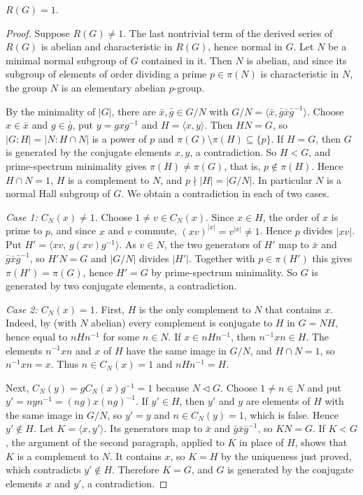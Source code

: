 \documentclass[11pt,colorlinks]{charlie}
\newcommand{\gen}[1]{\langle #1\rangle}
\begin{document}
\begin{proposition}\label{prop:radical}
$R(G)=1$.
\end{proposition}

\begin{proof}
Suppose $R(G)\ne1$. The last nontrivial term of the derived series of $R(G)$ is abelian and characteristic in $R(G)$, hence normal in $G$. Let $N$ be a minimal normal subgroup of $G$ contained in it. Then $N$ is abelian, and since its subgroup of elements of order dividing a prime $p\in\pi(N)$ is characteristic in $N$, the group $N$ is an elementary abelian $p$-group.

By the minimality of $|G|$, there are $\bar x,\bar g\in G/N$ with $G/N=\gen{\bar x,\bar g\bar x\bar g^{-1}}$. Choose $x\in\bar x$ and $g\in\bar g$, put $y=gxg^{-1}$ and $H=\gen{x,y}$. Then $HN=G$, so $|G:H|=|N:H\cap N|$ is a power of $p$ and $\pi(G)\setminus\pi(H)\subseteq\{p\}$. If $H=G$, then $G$ is generated by the conjugate elements $x,y$, a contradiction. So $H<G$, and prime-spectrum minimality gives $\pi(H)\ne\pi(G)$, that is, $p\notin\pi(H)$. Hence $H\cap N=1$, $H$ is a complement to $N$, and $p\nmid|H|=|G/N|$. In particular $N$ is a normal Hall subgroup of $G$. We obtain a contradiction in each of two cases.

\emph{Case 1: $C_N(x)\ne1$.} Choose $1\ne v\in C_N(x)$. Since $x\in H$, the order of $x$ is prime to $p$, and since $x$ and $v$ commute, $(xv)^{|x|}=v^{|x|}\ne1$. Hence $p$ divides $|xv|$. Put $H'=\gen{xv,\,g(xv)g^{-1}}$. As $v\in N$, the two generators of $H'$ map to $\bar x$ and $\bar g\bar x\bar g^{-1}$, so $H'N=G$ and $|G/N|$ divides $|H'|$. Together with $p\in\pi(H')$ this gives $\pi(H')=\pi(G)$, hence $H'=G$ by prime-spectrum minimality. So $G$ is generated by two conjugate elements, a contradiction.

\emph{Case 2: $C_N(x)=1$.} First, $H$ is the only complement to $N$ that contains $x$. Indeed, by  (with $N$ abelian) every complement is conjugate to $H$ in $G=NH$, hence equal to $nHn^{-1}$ for some $n\in N$. If $x\in nHn^{-1}$, then $n^{-1}xn\in H$. The elements $n^{-1}xn$ and $x$ of $H$ have the same image in $G/N$, and $H\cap N=1$, so $n^{-1}xn=x$. Thus $n\in C_N(x)=1$ and $nHn^{-1}=H$.

Next, $C_N(y)=gC_N(x)g^{-1}=1$ because $N\lhd G$. Choose $1\ne n\in N$ and put $y'=nyn^{-1}=(ng)x(ng)^{-1}$. If $y'\in H$, then $y'$ and $y$ are elements of $H$ with the same image in $G/N$, so $y'=y$ and $n\in C_N(y)=1$, which is false. Hence $y'\notin H$. Let $K=\gen{x,y'}$. Its generators map to $\bar x$ and $\bar g\bar x\bar g^{-1}$, so $KN=G$. If $K<G$, the argument of the second paragraph, applied to $K$ in place of $H$, shows that $K$ is a complement to $N$. It contains $x$, so $K=H$ by the uniqueness just proved, which contradicts $y'\notin H$. Therefore $K=G$, and $G$ is generated by the conjugate elements $x$ and $y'$, a contradiction.
\end{proof}
\end{document}
